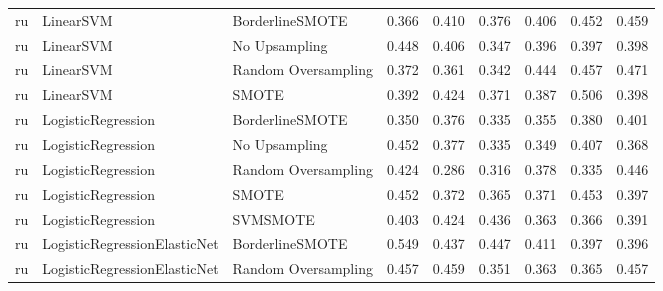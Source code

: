 \begin{tabular}{lllllllll}
      ru &                    LinearSVM &     BorderlineSMOTE & 0.366 &                     0.410 &                 0.376 &                  0.406 &                                   0.452 &     0.459 \\
      ru &                    LinearSVM &       No Upsampling & 0.448 &                     0.406 &                 0.347 &                  0.396 &                                   0.397 &     0.398 \\
      ru &                    LinearSVM & Random Oversampling & 0.372 &                     0.361 &                 0.342 &                  0.444 &                                   0.457 &     0.471 \\
      ru &                    LinearSVM &               SMOTE & 0.392 &                     0.424 &                 0.371 &                  0.387 &                                   0.506 &     0.398 \\
      ru &           LogisticRegression &     BorderlineSMOTE & 0.350 &                     0.376 &                 0.335 &                  0.355 &                                   0.380 &     0.401 \\
      ru &           LogisticRegression &       No Upsampling & 0.452 &                     0.377 &                 0.335 &                  0.349 &                                   0.407 &     0.368 \\
      ru &           LogisticRegression & Random Oversampling & 0.424 &                     0.286 &                 0.316 &                  0.378 &                                   0.335 &     0.446 \\
      ru &           LogisticRegression &               SMOTE & 0.452 &                     0.372 &                 0.365 &                  0.371 &                                   0.453 &     0.397 \\
      ru &           LogisticRegression &            SVMSMOTE & 0.403 &                     0.424 &                 0.436 &                  0.363 &                                   0.366 &     0.391 \\
      ru & LogisticRegressionElasticNet &     BorderlineSMOTE & 0.549 &                     0.437 &                 0.447 &                  0.411 &                                   0.397 &     0.396 \\
      ru & LogisticRegressionElasticNet & Random Oversampling & 0.457 &                     0.459 &                 0.351 &                  0.363 &                                   0.365 &     0.457 \\

\end{tabular}
